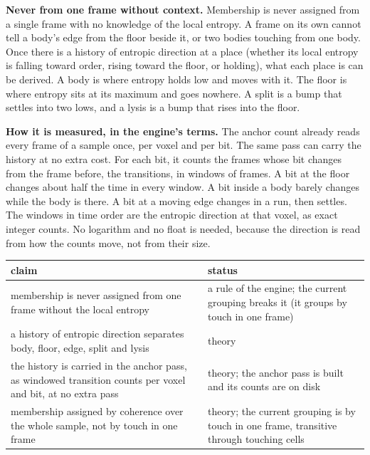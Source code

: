 \textbf{Never from one frame without context.} Membership is never assigned from a single frame with no knowledge of the local entropy. A frame on its own cannot tell a body's edge from the floor beside it, or two bodies touching from one body. Once there is a history of entropic direction at a place (whether its local entropy is falling toward order, rising toward the floor, or holding), what each place is can be derived. A body is where entropy holds low and moves with it. The floor is where entropy sits at its maximum and goes nowhere. A split is a bump that settles into two lows, and a lysis is a bump that rises into the floor.

\textbf{How it is measured, in the engine's terms.} The anchor count already reads every frame of a sample once, per voxel and per bit. The same pass can carry the history at no extra cost. For each bit, it counts the frames whose bit changes from the frame before, the transitions, in windows of frames. A bit at the floor changes about half the time in every window. A bit inside a body barely changes while the body is there. A bit at a moving edge changes in a run, then settles. The windows in time order are the entropic direction at that voxel, as exact integer counts. No logarithm and no float is needed, because the direction is read from how the counts move, not from their size.

{\small
\setlength{\tabcolsep}{6pt}
\begin{longtable}{>{\RaggedRight\arraybackslash}p{}>{\RaggedRight\arraybackslash}p{}}
\toprule
claim & status \\
\midrule
\endhead
membership is never assigned from one frame without the local entropy & a rule of the engine; the current grouping breaks it (it groups by touch in one frame) \\
a history of entropic direction separates body, floor, edge, split and lysis & theory \\
the history is carried in the anchor pass, as windowed transition counts per voxel and bit, at no extra pass & theory; the anchor pass is built and its counts are on disk \\
membership assigned by coherence over the whole sample, not by touch in one frame & theory; the current grouping is by touch in one frame, transitive through touching cells \\
\bottomrule
\end{longtable}
}
